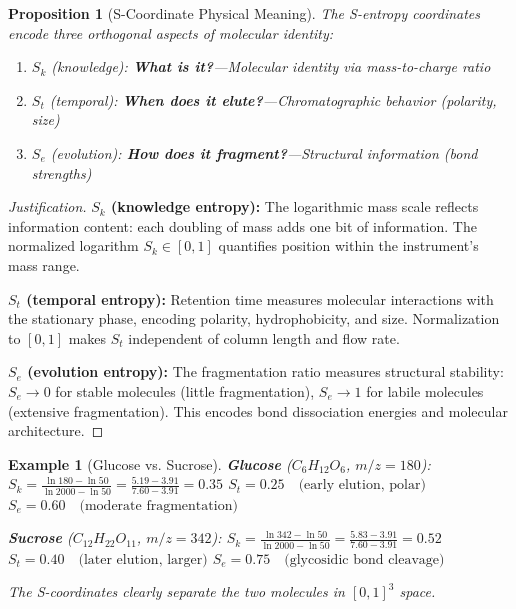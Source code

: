 \documentclass[twocolumn,10pt]{article}
\newtheorem{proposition}[theorem]{Proposition}
\newtheorem{example}[theorem]{Example}
\begin{document}
\begin{proposition}[S-Coordinate Physical Meaning]
\label{prop:sphysical}
The S-entropy coordinates encode three orthogonal aspects of molecular identity:
\begin{enumerate}
    \item $S_k$ (\emph{knowledge}): \textbf{What is it?}—Molecular identity via mass-to-charge ratio
    \item $S_t$ (\emph{temporal}): \textbf{When does it elute?}—Chromatographic behavior (polarity, size)
    \item $S_e$ (\emph{evolution}): \textbf{How does it fragment?}—Structural information (bond strengths)
\end{enumerate}
\end{proposition}

\begin{proof}[Justification]
\textbf{$S_k$ (knowledge entropy):} The logarithmic mass scale reflects information content: each doubling of mass adds one bit of information. The normalized logarithm $S_k \in [0,1]$ quantifies position within the instrument's mass range.

\textbf{$S_t$ (temporal entropy):} Retention time measures molecular interactions with the stationary phase, encoding polarity, hydrophobicity, and size. Normalization to $[0,1]$ makes $S_t$ independent of column length and flow rate.

\textbf{$S_e$ (evolution entropy):} The fragmentation ratio measures structural stability: $S_e \to 0$ for stable molecules (little fragmentation), $S_e \to 1$ for labile molecules (extensive fragmentation). This encodes bond dissociation energies and molecular architecture.
\end{proof}

\begin{example}[Glucose vs. Sucrose]
\label{ex:glucose_sucrose}
\textbf{Glucose} ($C_6H_{12}O_6$, $m/z = 180$):
$
S_k = \frac{\ln 180 - \ln 50}{\ln 2000 - \ln 50} = \frac{5.19 - 3.91}{7.60 - 3.91} = 0.35
$
$
S_t = 0.25 \quad \text{(early elution, polar)}
$
$
S_e = 0.60 \quad \text{(moderate fragmentation)}
$

\textbf{Sucrose} ($C_{12}H_{22}O_{11}$, $m/z = 342$):
$
S_k = \frac{\ln 342 - \ln 50}{\ln 2000 - \ln 50} = \frac{5.83 - 3.91}{7.60 - 3.91} = 0.52
$
$
S_t = 0.40 \quad \text{(later elution, larger)}
$
$
S_e = 0.75 \quad \text{(glycosidic bond cleavage)}
$

The S-coordinates clearly separate the two molecules in $[0,1]^3$ space.
\end{example}
\end{document}
